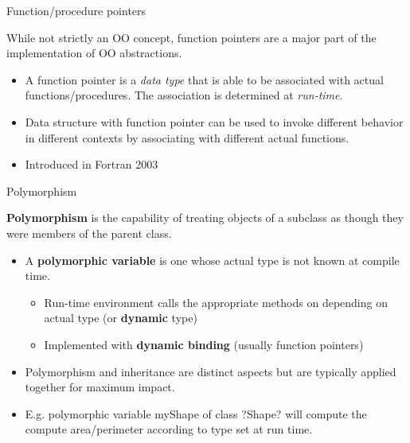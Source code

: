 \documentclass[11pt]{beamer}
\begin{document}
\begin{frame}{Function/procedure pointers}

While not strictly an OO concept, function pointers are a major part of the implementation of OO abstractions.
\begin{itemize}

  \item A function pointer is a \emph{data type} that is able to be associated with actual functions/procedures. The association is determined at \emph{run-time}.

  \item Data structure with function pointer can be used to invoke different behavior in different contexts by associating with different actual functions.
  \item Introduced in Fortran 2003
  
 \end{itemize}

\end{frame}




\begin{frame}{Polymorphism}

\textbf{Polymorphism} is the capability of treating objects of a subclass as though they were members of the parent class.
\begin{itemize}

  \item A \textbf{polymorphic variable} is one whose actual type is not known at compile time.
    \begin{itemize}
    \item Run-time environment calls the appropriate methods on depending on actual type (or \textbf{dynamic} type)
    \item Implemented with \textbf{dynamic binding} (usually function pointers)
    \end{itemize}

  \item Polymorphism and inheritance are distinct aspects but are typically applied together for maximum impact.
  \item E.g. polymorphic variable myShape of class ?Shape? will compute the compute area/perimeter according to type set at run time.
  
 \end{itemize}

\end{frame}
\end{document}
